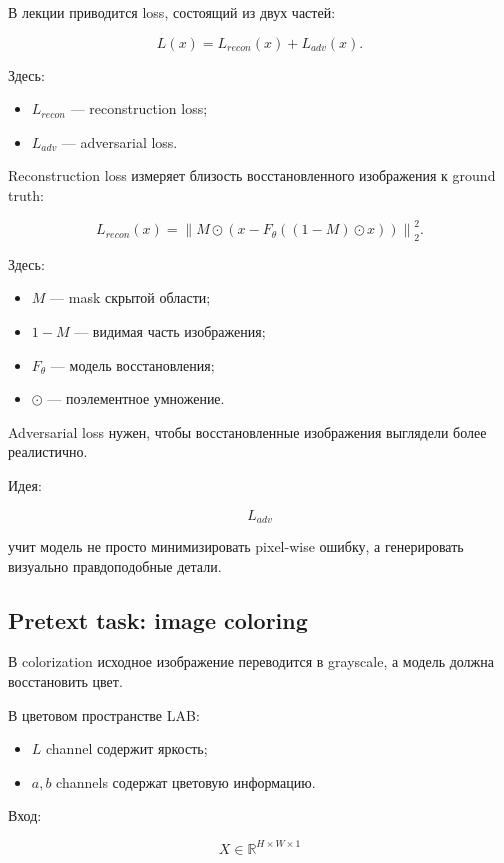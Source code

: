 \documentclass[a4paper,12pt]{article}
\begin{document}
В лекции приводится loss, состоящий из двух частей:

\[
L(x) = L_{recon}(x) + L_{adv}(x).
\]

Здесь:

\begin{itemize}
    \item \(L_{recon}\) --- reconstruction loss;
    \item \(L_{adv}\) --- adversarial loss.
\end{itemize}

Reconstruction loss измеряет близость восстановленного изображения к ground truth:

\[
L_{recon}(x)
=
\left\|
M \odot
\left(
x - F_\theta((1-M)\odot x)
\right)
\right\|_2^2.
\]

Здесь:

\begin{itemize}
    \item \(M\) --- mask скрытой области;
    \item \(1-M\) --- видимая часть изображения;
    \item \(F_\theta\) --- модель восстановления;
    \item \(\odot\) --- поэлементное умножение.
\end{itemize}

Adversarial loss нужен, чтобы восстановленные изображения выглядели более реалистично.

Идея:

\[
L_{adv}
\]

учит модель не просто минимизировать pixel-wise ошибку, а генерировать визуально правдоподобные детали.

\subsection{Pretext task: image coloring}

В colorization исходное изображение переводится в grayscale, а модель должна восстановить цвет.

В цветовом пространстве LAB:

\begin{itemize}
    \item \(L\) channel содержит яркость;
    \item \(a,b\) channels содержат цветовую информацию.
\end{itemize}

Вход:

\[
X \in \mathbb{R}^{H \times W \times 1}
\]
\end{document}
